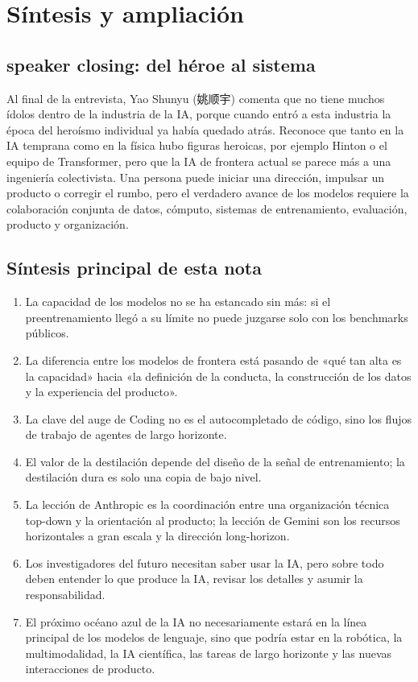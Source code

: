\section{Síntesis y ampliación}

\subsection{ speaker closing: del héroe al sistema}

Al final de la entrevista, Yao Shunyu (姚顺宇) comenta que no tiene muchos ídolos dentro de la industria de la IA, porque cuando entró a esta industria la época del heroísmo individual ya había quedado atrás. Reconoce que tanto en la IA temprana como en la física hubo figuras heroicas, por ejemplo Hinton o el equipo de Transformer, pero que la IA de frontera actual se parece más a una ingeniería colectivista. Una persona puede iniciar una dirección, impulsar un producto o corregir el rumbo, pero el verdadero avance de los modelos requiere la colaboración conjunta de datos, cómputo, sistemas de entrenamiento, evaluación, producto y organización.

\subsection{Síntesis principal de esta nota}

\begin{enumerate}
\item La capacidad de los modelos no se ha estancado sin más: si el preentrenamiento llegó a su límite no puede juzgarse solo con los benchmarks públicos.
\item La diferencia entre los modelos de frontera está pasando de «qué tan alta es la capacidad» hacia «la definición de la conducta, la construcción de los datos y la experiencia del producto».
\item La clave del auge de Coding no es el autocompletado de código, sino los flujos de trabajo de agentes de largo horizonte.
\item El valor de la destilación depende del diseño de la señal de entrenamiento; la destilación dura es solo una copia de bajo nivel.
\item La lección de Anthropic es la coordinación entre una organización técnica top-down y la orientación al producto; la lección de Gemini son los recursos horizontales a gran escala y la dirección long-horizon.
\item Los investigadores del futuro necesitan saber usar la IA, pero sobre todo deben entender lo que produce la IA, revisar los detalles y asumir la responsabilidad.
\item El próximo océano azul de la IA no necesariamente estará en la línea principal de los modelos de lenguaje, sino que podría estar en la robótica, la multimodalidad, la IA científica, las tareas de largo horizonte y las nuevas interacciones de producto.
\end{enumerate}

